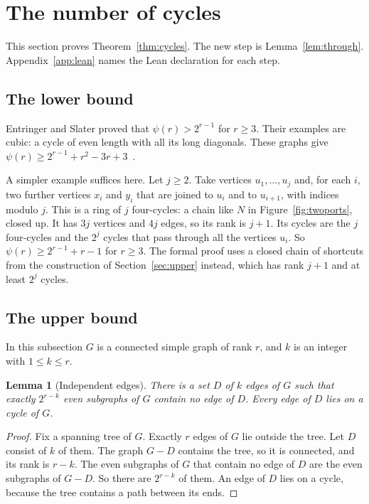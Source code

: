 \documentclass[11pt]{article}
\newtheorem{lemma}[theorem]{Lemma}
\theoremstyle{definition}
\theoremstyle{remark}
\numberwithin{equation}{section}
\begin{document}
\section{The number of cycles}\label{sec:cycles}

This section proves Theorem~\ref{thm:cycles}. The new step is Lemma~\ref{lem:through}.
Appendix~\ref{app:lean} names the Lean declaration for each step.

\subsection{The lower bound}

Entringer and Slater proved that $\psi(r)>2^{r-1}$ for $r\ge3$. Their examples are cubic: a cycle of
even length with all its long diagonals. These graphs give
$\psi(r)\ge2^{r-1}+r^{2}-3r+3$~\cite[Corollary~4]{ES}.

A simpler example suffices here. Let $j\ge2$. Take vertices $u_1,\dots,u_j$ and, for each $i$, two
further vertices $x_i$ and $y_i$ that are joined to $u_i$ and to $u_{i+1}$, with indices modulo $j$.
This is a ring of $j$ four-cycles: a chain like $N$ in Figure~\ref{fig:twoports}, closed up. It has
$3j$ vertices and $4j$ edges, so its rank is $j+1$. Its cycles are the $j$ four-cycles and the
$2^{j}$ cycles that pass through all the vertices $u_i$. So $\psi(r)\ge2^{r-1}+r-1$ for $r\ge3$.
The formal proof uses a closed chain of shortcuts from the construction of
Section~\ref{sec:upper} instead, which has rank $j+1$ and at least $2^{j}$ cycles.

\subsection{The upper bound}

In this subsection $G$ is a connected simple graph of rank $r$, and $k$ is an integer with
$1\le k\le r$.

\begin{lemma}[Independent edges]\label{lem:indep}
There is a set $D$ of $k$ edges of $G$ such that exactly $2^{r-k}$ even subgraphs of $G$ contain no
edge of $D$. Every edge of $D$ lies on a cycle of $G$.
\end{lemma}

\begin{proof}
Fix a spanning tree of $G$. Exactly $r$ edges of $G$ lie outside the tree. Let $D$ consist of $k$
of them. The graph $G-D$ contains the tree, so it is connected, and its rank is $r-k$. The even
subgraphs of $G$ that contain no edge of $D$ are the even subgraphs of $G-D$. So there are
$2^{r-k}$ of them. An edge of $D$ lies on a cycle, because the tree contains a path between its
ends.
\end{proof}
\end{document}
